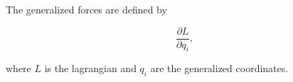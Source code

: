 The generalized forces are defined by

$$\frac{\partial L}{\partial q_i},$$

where $L$ is the lagrangian and $q_i$ are the generalized coordinates.
